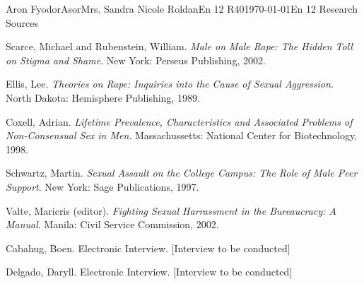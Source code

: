 \documentclass[letterpaper,12pt]{article}
\begin{document}
\begin{mla}{Aron Fyodor}{Asor}{Mrs. Sandra Nicole Roldan}{En 12 R40}{\today}{En 12 Research Sources}


\bibent
	Scarce, Michael and Rubenstein, William. \textit{Male on Male Rape: The Hidden Toll on Stigma and Shame}. New York: Perseus Publishing, 2002.

\bibent	
Ellis, Lee. \textit{Theories on Rape: Inquiries into the Cause of Sexual Aggression}. North Dakota: Hemisphere Publishing, 1989.

\bibent
Coxell, Adrian. \textit{Lifetime Prevalence, Characteristics and Associated Problems of Non-Consensual Sex in Men}. Massachussetts: National Center for Biotechnology, 1998.

\bibent
Schwartz, Martin. \textit{Sexual Assault on the College Campus: The Role of Male Peer Support}. New York: Sage Publications, 1997.

\bibent
Valte, Maricris (editor). \textit{Fighting Sexual Harrassment in the Bureaucracy: A Manual}. Manila: Civil Service Commission, 2002.

\bibent
Cabahug, Boen. Electronic Interview. $[$Interview to be conducted$]$

\bibent
Delgado, Daryll. Electronic Interview. $[$Interview to be conducted$]$

\end{mla}



\end{document}
